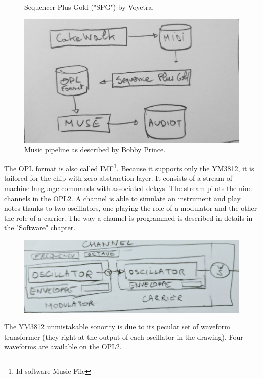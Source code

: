 \documentclass[book.tex]{subfiles}
\begin{document}
\begin{figure}[H]
\centering
\caption{Sequencer Plus Gold ("SPG") by Voyetra.}
\end{figure}

\begin{figure}[H]
\centering
 \includegraphics[width=\textwidth]{imgs/drawings/music_pipeline.png}
 \caption{Music pipeline as described by Bobby Prince.}
\end{figure}
The OPL format is also called IMF\footnote{Id software Music File}. Because it supports only the YM3812, it is tailored for the chip with zero abstraction layer. It consists of a stream of machine language commands with associated delays. The stream pilots the nine channels in the OPL2. A channel is able to simulate an instrument and play notes thanks to two oscillators, one playing the role of a modulator and the other the role of a carrier. The way a channel is programmed is described in details in the "Software" chapter.
\begin{figure}[H]
\centering
 \includegraphics[width=\textwidth]{imgs/drawings/channel.png}
\end{figure}
\par
{}  The YM3812 unmistakable sonority is due to its pecular set of waveform transformer (they right at the output of each oscillator in the drawing). Four waveforms are available on the OPL2.
\end{document}
